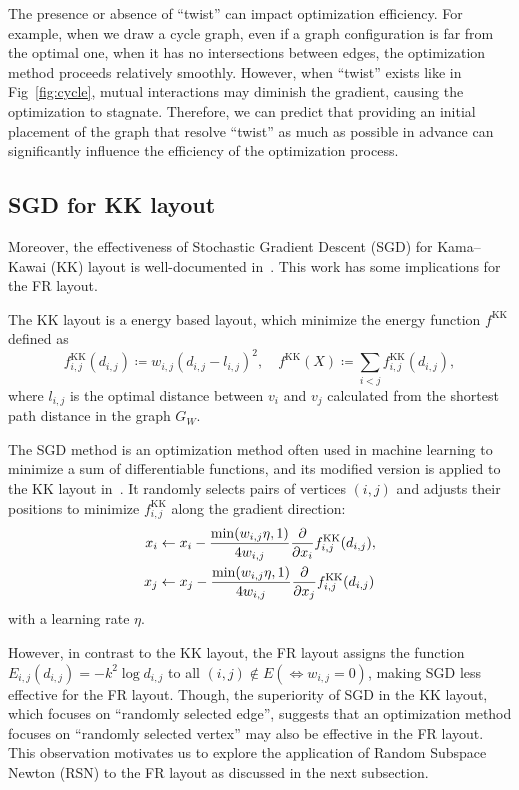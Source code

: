 \documentclass[dvipdfmx,lettersize,journal]{IEEEtran}
\newcommand{\defeq}{\coloneqq}
\begin{document}
The presence or absence of ``twist'' can impact optimization efficiency.
For example, when we draw a cycle graph, even if a graph configuration is far from the optimal one, when it has no intersections between edges, the optimization method proceeds relatively smoothly.
However, when ``twist'' exists like in Fig~\ref{fig:cycle}, mutual interactions may diminish the gradient, causing the optimization to stagnate.
Therefore, we can predict that providing an initial placement of the graph that resolve ``twist'' as much as possible in advance can significantly influence the efficiency of the optimization process.

\subsection{SGD for KK layout}\label{ssec:sgd}

Moreover, the effectiveness of Stochastic Gradient Descent (SGD) for Kama--Kawai (KK) layout is well-documented in~\cite{8419285}. This work has some implications for the FR layout.

The KK layout is a energy based layout, which minimize the energy function $f^{\mathrm{KK}}$ defined as
\begin{equation*}
  f^{\mathrm{KK}}_{i,j}(d_{i,j}) \defeq w_{i,j} (d_{i,j}-l_{i,j})^2, \quad
  f^{\mathrm{KK}}(X) \defeq \sum_{i<j} f^{\mathrm{KK}}_{i,j}(d_{i,j}),
\end{equation*}
where $l_{i,j}$ is the optimal distance between $v_i$ and $v_j$ calculated from the shortest path distance in the graph $G_W$.

The SGD method is an optimization method often used in machine learning to minimize a sum of differentiable functions, and its modified version is applied to the KK layout in~\cite{8419285}.
It randomly selects pairs of vertices $(i,j)$ and adjusts their positions to minimize $f^{\mathrm{KK}}_{i,j}$ along the gradient direction:
\begin{align*}
  x_i & \gets x_i - \frac{\min(w_{i,j}\eta,1)}{4w_{i,j}} \pdv{x_i} f^{\mathrm{KK}}_{i,j}(d_{i,j}), \\
  x_j & \gets x_j - \frac{\min(w_{i,j}\eta,1)}{4w_{i,j}} \pdv{x_j} f^{\mathrm{KK}}_{i,j}(d_{i,j})
\end{align*}
with a learning rate $\eta$.

However, in contrast to the KK layout, the FR layout assigns the function $E_{i,j}(d_{i,j})=-k^2\log{d_{i,j}}$ to all $(i,j) \notin E (\iff w_{i,j}=0)$, making SGD less effective for the FR layout.
Though, the superiority of SGD in the KK layout, which focuses on ``randomly selected edge'', suggests that an optimization method focuses on ``randomly selected vertex'' may also be effective in the FR layout.
This observation motivates us to explore the application of Random Subspace Newton (RSN) to the FR layout as discussed in the next subsection.
\end{document}
